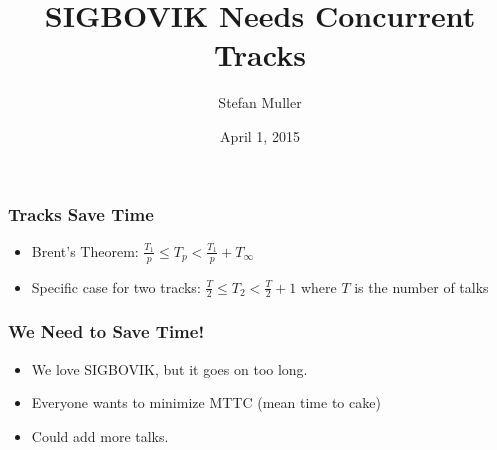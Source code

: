 \documentclass{beamer}
\title{SIGBOVIK Needs Concurrent Tracks}
\author{Stefan Muller}
\date{April 1, 2015}
\institute{SIGBOVIK Organizing Committee}
\begin{document}
\begin{frame}
\maketitle
\end{frame}

{
\begin{frame}
\frametitle{Tracks Save Time}
\vspace{1em}
\begin{itemize}
\color{red}
\item Brent's Theorem: $\frac{T_1}{p} \leq T_p < \frac{T_1}{p} + T_\infty$
\item Specific case for two tracks:
$\frac{T}{2} \leq T_2 < \frac{T}{2} + 1$
where $T$ is the number of talks
\end{itemize}
\end{frame}
}

\begin{frame}
\frametitle{We Need to Save Time!}
\begin{itemize}
\item We love SIGBOVIK, but it goes on too long.
\pause
\item Everyone wants to minimize MTTC (mean time to cake)
\pause
\item Could \pause add \pause more \pause talks.
\end{itemize}
\end{frame}
\end{document}
